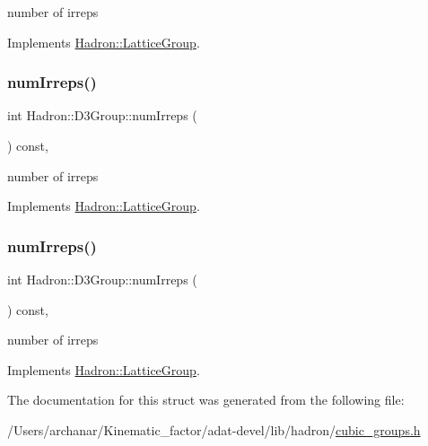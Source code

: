 number of irreps 

Implements \mbox{\hyperlink{structHadron_1_1LatticeGroup_a3edaca488144b5d2a9cf73fe653add34}{Hadron\+::\+Lattice\+Group}}.

\mbox{\label{structHadron_1_1D3Group_a33e3822d1ec56e4928e5bc47b655f69f}} 
\subsubsection{\texorpdfstring{numIrreps()}{numIrreps()}\hspace{0.1cm}{\footnotesize\ttfamily [2/3]}}
{\footnotesize\ttfamily int Hadron\+::\+D3\+Group\+::num\+Irreps (\begin{DoxyParamCaption}{ }\end{DoxyParamCaption}) const\hspace{0.3cm}{\ttfamily [inline]}, {\ttfamily [virtual]}}

number of irreps 

Implements \mbox{\hyperlink{structHadron_1_1LatticeGroup_a3edaca488144b5d2a9cf73fe653add34}{Hadron\+::\+Lattice\+Group}}.

\mbox{\label{structHadron_1_1D3Group_a33e3822d1ec56e4928e5bc47b655f69f}} 
\subsubsection{\texorpdfstring{numIrreps()}{numIrreps()}\hspace{0.1cm}{\footnotesize\ttfamily [3/3]}}
{\footnotesize\ttfamily int Hadron\+::\+D3\+Group\+::num\+Irreps (\begin{DoxyParamCaption}{ }\end{DoxyParamCaption}) const\hspace{0.3cm}{\ttfamily [inline]}, {\ttfamily [virtual]}}

number of irreps 

Implements \mbox{\hyperlink{structHadron_1_1LatticeGroup_a3edaca488144b5d2a9cf73fe653add34}{Hadron\+::\+Lattice\+Group}}.



The documentation for this struct was generated from the following file\+:\begin{DoxyCompactItemize}
\item 
/\+Users/archanar/\+Kinematic\+\_\+factor/adat-\/devel/lib/hadron/\mbox{\hyperlink{adat-devel_2lib_2hadron_2cubic__groups_8h}{cubic\+\_\+groups.\+h}}\end{DoxyCompactItemize}
